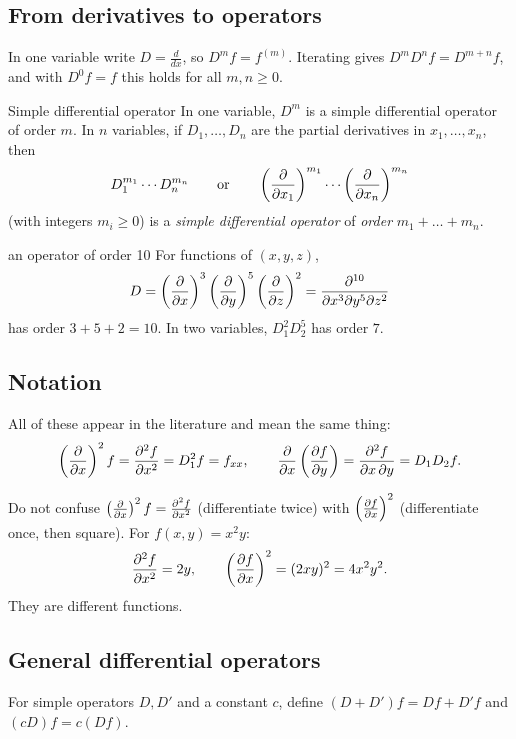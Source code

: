 \subsection{From derivatives to operators}

In one variable write $D=\frac{d}{dx}$, so $D^mf=f^{(m)}$. Iterating gives
$D^mD^nf=D^{m+n}f$, and with $D^0f=f$ this holds for all $m,n\ge0$.

\begin{definition}{Simple differential operator}
In one variable, $D^m$ is a simple differential operator of order $m$. In $n$ variables, if
$D_1,\dots,D_n$ are the partial derivatives in $x_1,\dots,x_n$, then
\[
D_1^{m_1}\cdots D_n^{m_n}\qquad\text{or}\qquad\left(\frac{\partial }{\partial x_1}\right)^{m_1}\cdots\left(\frac{\partial }{\partial x_n}\right)^{m_n}
\]
(with integers $m_i\ge0$) is a \emph{simple differential operator} of \emph{order}
$m_1+\dots+m_n$.
\end{definition}

\begin{example}{an operator of order 10}
For functions of $(x,y,z)$,
\[
D=\left(\frac{\partial }{\partial x}\right)^3\left(\frac{\partial }{\partial y}\right)^5\left(\frac{\partial }{\partial z}\right)^2=\frac{\partial^{10}}{\partial x^3\partial y^5\partial z^2}
\]
has order $3+5+2=10$. In two variables, $D_1^2D_2^5$ has order $7$.
\end{example}

\subsection{Notation}

All of these appear in the literature and mean the same thing:
\[
\left(\frac{\partial }{\partial x}\right)^2f=\frac{\partial^2 f}{\partial x^2}=D_1^2f=f_{xx},\qquad
\frac{\partial }{\partial x}\left(\frac{\partial f}{\partial y}\right)=\frac{\partial^2 f}{\partial x\,\partial y}=D_1D_2f .
\]

\begin{trap}
Do not confuse $\left(\frac{\partial }{\partial x}\right)^2f=\frac{\partial^2 f}{\partial x^2}$ (differentiate twice) with
$\left(\frac{\partial f}{\partial x}\right)^2$ (differentiate once, then square). For $f(x,y)=x^2y$:
\[ \frac{\partial^2 f}{\partial x^2}=2y,\qquad\left(\frac{\partial f}{\partial x}\right)^2=(2xy)^2=4x^2y^2 . \]
They are different functions.
\end{trap}

\subsection{General differential operators}

For simple operators $D,D'$ and a constant $c$, define $(D+D')f=Df+D'f$ and $(cD)f=c(Df)$.

